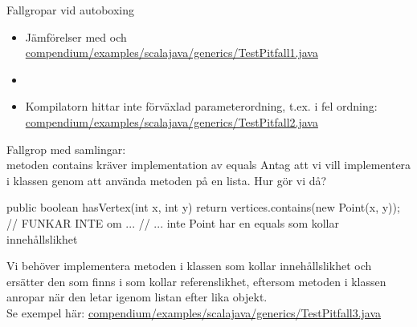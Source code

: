 \begin{Slide}{Fallgropar vid autoboxing}
\begin{itemize}
\item Jämförelser med \code{==} och \code{!=} \\
\href{https://github.com/lunduniversity/introprog/blob/master/compendium/examples/scalajava/generics/TestPitfall1.java}
{\SlideFontSmall  compendium/examples/scalajava/generics/TestPitfall1.java}
\item[]
\item Kompilatorn hittar inte förväxlad parameterordning, t.ex.  i fel ordning: \sout{}\\
\href{https://github.com/lunduniversity/introprog/blob/master/compendium/examples/scalajava/generics/TestPitfall2.java}
{\SlideFontSmall compendium/examples/scalajava/generics/TestPitfall2.java}
\end{itemize}
\end{Slide}

\begin{Slide}{Fallgrop med samlingar: \\ metoden contains kräver implementation av equals}\SlideFontSmall
Antag att vi vill implementera  i klassen  genom att använda metoden  på en lista. Hur gör vi då?
\pause
\begin{Code}[numberstyle=,language=Java]
public boolean hasVertex(int x, int y) {
    return vertices.contains(new Point(x, y)); // FUNKAR INTE om ...
    // ... inte Point har en equals som kollar innehållslikhet
}
\end{Code}
Vi behöver implementera metoden  i klassen  som kollar innehållslikhet och ersätter den  som finns i  som kollar referenslikhet, eftersom metoden  i klassen  anropar  när den letar igenom listan efter lika objekt. \\
Se exempel här: \href{https://github.com/lunduniversity/introprog/tree/master/compendium/examples/scalajava/generics/TestPitfall3.java}{compendium/examples/scalajava/generics/TestPitfall3.java} \\


\end{Slide}


